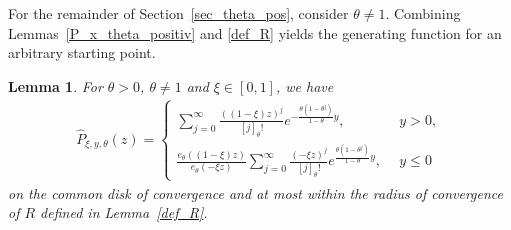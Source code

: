 \documentclass[12pt]{article}
\newcommand{\1}{\mathds{1}}
\theoremstyle{definition}
\theoremstyle{plain}
\newtheorem{Lemma}[definition]{Lemma}
\theoremstyle{remark}
\begin{document}
    For the remainder of Section~\ref{sec_theta_pos}, consider $\theta\neq 1$.
Combining Lemmas~\ref{P_x_theta_positiv} and \ref{def_R} yields the generating function for an arbitrary starting point.
\begin{Lemma}\label{gf_pos_theta}
   For $\theta>0$, $\theta\neq 1$ and $\xi\in[0,1]$, we have
    \begin{align*}
      \hat{P}_{\xi,y,\theta}(z)=\begin{cases}
        \sum_{j=0}^\infty \frac{((1-\xi)z)^j}{[j]_\theta!}e^{-\frac{\theta(1-\theta^j)}{1-\theta}y},&y>0,
          \\\frac{e_\theta((1-\xi)z)}{e_\theta(-\xi z)}\sum_{j=0}^\infty \frac{(-\xi z)^{j}}{[j]_\theta!}e^{\frac{\theta(1-\theta^j)}{1-\theta}y},~~&y\le 0
      \end{cases}
    \end{align*}
    on the common disk of convergence and at most within the radius of convergence of $R$ defined in Lemma~\ref{def_R}.
\end{Lemma}
\end{document}
